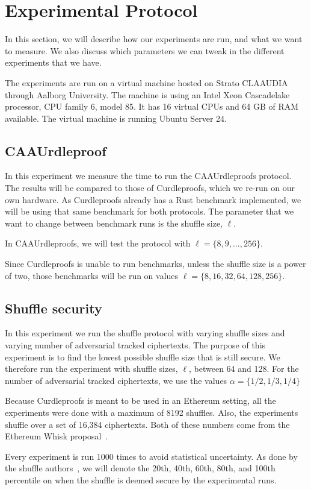 
\section{Experimental Protocol}\label{sec:experimental-protocol}
In this section, we will describe how our experiments are run, and what we want to measure.
We also discuss which parameters we can tweak in the different experiments that we have.

The experiments are run on a virtual machine hosted on Strato CLAAUDIA through Aalborg University.
The machine is using an Intel Xeon Cascadelake processor, CPU family 6, model 85.
It has 16 virtual CPUs and 64 GB of RAM available.
The virtual machine is running Ubuntu Server 24.


\subsection{CAAUrdleproof}\label{sec:CAAUrdleproof-experiment}
In this experiment we measure the time to run the CAAUrdleproofs protocol.
The results will be compared to those of Curdleproofs, which we re-run on our own hardware.
As Curdleproofs already has a Rust benchmark implemented, we will be using that same benchmark for both protocols.
The parameter that we want to change between benchmark runs is the shuffle size, $\ell$.

In CAAUrdleproofs, we will test the protocol with $\ell=\{8,9,\dots,256\}$.

Since Curdleproofs is unable to run benchmarks, unless the shuffle size is a power of two, those benchmarks will be run on values $\ell=\{8,16,32,64,128,256\}$.




\subsection{Shuffle security}\label{subsec:experimental-protocol-shuffle-security}
In this experiment we run the shuffle protocol with varying shuffle sizes and varying number of adversarial tracked ciphertexts.
The purpose of this experiment is to find the lowest possible shuffle size that is still secure.
We therefore run the experiment with shuffle sizes, $\ell$, between 64 and 128.
For the number of adversarial tracked ciphertexts, we use the values $\alpha=\{1/2,1/3,1/4\}$

Because Curdleproofs is meant to be used in an Ethereum setting, all the experiments were done with a maximum of 8192 shuffles.
Also, the experiments shuffle over a set of 16,384 ciphertexts.
Both of these numbers come from the Ethereum Whisk proposal~\cite{Whisk2024}.


Every experiment is run 1000 times to avoid statistical uncertainty.
As done by the shuffle authors~\cite{cryptoeprint:2022/560}, we will denote the 20th, 40th, 60th, 80th, and 100th percentile on when the shuffle is deemed secure by the experimental runs.

